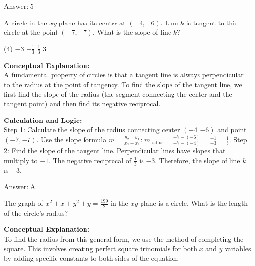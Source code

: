 \documentclass[11pt,paper=a4,answers]{exam}
\begin{document}
\begin{questions}
\begin{solution}
\vspace{30pt}

Answer: \colorbox{yellow!100}{5}
\end{solution}

\vspace{60pt}

\question
A circle in the $xy$-plane has its center at $(-4, -6)$. Line $k$ is tangent to this circle at the point $(-7, -7)$. What is the slope of line $k$?
\begin{tasks}(4)
    \task $-3$
    \task $-\frac{1}{3}$
    \task $\frac{1}{3}$
    \task $3$
\end{tasks}

\begin{solution}
\textbf{Conceptual Explanation:} \\
A fundamental property of circles is that a tangent line is always perpendicular to the radius at the point of tangency. To find the slope of the tangent line, we first find the slope of the radius (the segment connecting the center and the tangent point) and then find its negative reciprocal.

\vspace{30pt}

\textbf{Calculation and Logic:} \\
Step 1: Calculate the slope of the radius connecting center $(-4, -6)$ and point $(-7, -7)$. Use the slope formula $m = \frac{y_2 - y_1}{x_2 - x_1}$: $m_{\text{radius}} = \frac{-7 - (-6)}{-7 - (-4)} = \frac{-1}{-3} = \frac{1}{3}$. Step 2: Find the slope of the tangent line. Perpendicular lines have slopes that multiply to $-1$. The negative reciprocal of $\frac{1}{3}$ is $-3$. Therefore, the slope of line $k$ is $-3$.

\vspace{30pt}

Answer: \colorbox{yellow!100}{A}
\end{solution}

\vspace{60pt}

\question
The graph of $x^2 + x + y^2 + y = \frac{199}{2}$ in the $xy$-plane is a circle. What is the length of the circle's radius?

\begin{solution}
\textbf{Conceptual Explanation:} \\
To find the radius from this general form, we use the method of completing the square. This involves creating perfect square trinomials for both $x$ and $y$ variables by adding specific constants to both sides of the equation.


\end{solution}
\end{questions}
\end{document}
